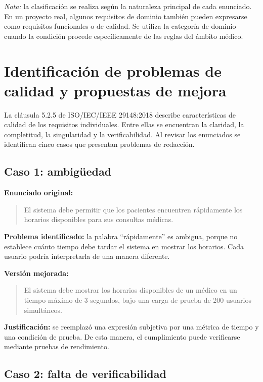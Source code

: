 \documentclass[12pt,a4paper]{article}
\begin{document}
\noindent\textit{Nota:} la clasificación se realiza según la naturaleza principal de cada enunciado. En un proyecto real, algunos requisitos de dominio también pueden expresarse como requisitos funcionales o de calidad. Se utiliza la categoría de dominio cuando la condición procede específicamente de las reglas del ámbito médico.

\section{Identificación de problemas de calidad y propuestas de mejora}

La cláusula 5.2.5 de ISO/IEC/IEEE 29148:2018 describe características de calidad de los requisitos individuales. Entre ellas se encuentran la claridad, la completitud, la singularidad y la verificabilidad. Al revisar los enunciados se identifican cinco casos que presentan problemas de redacción.

\subsection{Caso 1: ambigüedad}

\textbf{Enunciado original:}

\begin{quote}
El sistema debe permitir que los pacientes encuentren rápidamente los horarios disponibles para sus consultas médicas.
\end{quote}

\textbf{Problema identificado:} la palabra ``rápidamente'' es ambigua, porque no establece cuánto tiempo debe tardar el sistema en mostrar los horarios. Cada usuario podría interpretarla de una manera diferente.

\textbf{Versión mejorada:}

\begin{quote}
El sistema debe mostrar los horarios disponibles de un médico en un tiempo máximo de 3 segundos, bajo una carga de prueba de 200 usuarios simultáneos.
\end{quote}

\textbf{Justificación:} se reemplazó una expresión subjetiva por una métrica de tiempo y una condición de prueba. De esta manera, el cumplimiento puede verificarse mediante pruebas de rendimiento.

\subsection{Caso 2: falta de verificabilidad}
\end{document}

